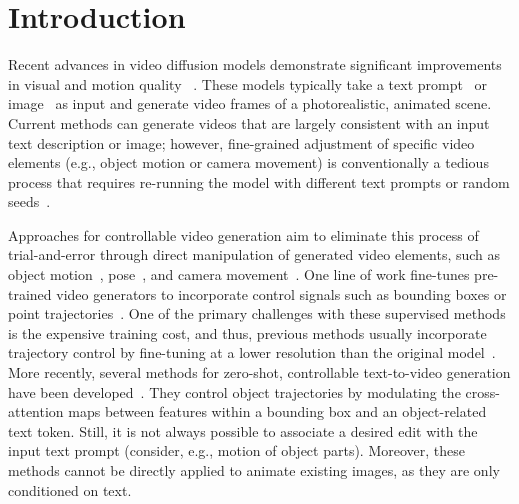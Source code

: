 \section{Introduction}
\label{sec:intro}

Recent advances in video diffusion models demonstrate significant improvements in visual and motion quality ~\citep{VideoDiffusionModels,blattmann2023stable,AlignYourLatents,LVDM}. 
These models typically take a text prompt~\citep{VideoDiffusionModels,blattmann2023stable,ImagenVideo} or image~\citep{VideoCrafter1,VideoCrafter2,AnimateDiff,DynamiCrafter} as input and generate video frames of a photorealistic, animated scene.
Current methods can generate videos that are largely consistent with an input text description or image; however, fine-grained adjustment of specific video elements (e.g., object motion or camera movement) is conventionally a tedious process that requires re-running the model with different text prompts or random seeds~\citep{wu2023freeinit,qiu2024freetraj}.

Approaches for controllable video generation aim to eliminate this process of trial-and-error through direct manipulation of generated video elements, such as object motion~\citep{wu2024draganything,yin2023dragnuwa,wang2024boximator}, pose~\citep{AnimateAnyone,MagicAnimate}, and camera movement~\citep{MotionCtrl,li2024image,CameraCtrl,MotionMaster}.
One line of work fine-tunes pre-trained video generators to incorporate control signals such as bounding boxes or point trajectories~\citep{wu2024draganything,MotionCtrl}. 
One of the primary challenges with these supervised methods is the expensive training cost, and thus, previous methods usually incorporate trajectory control by fine-tuning at a lower resolution than the original model~\cite{wu2024draganything, yin2023dragnuwa}.
More recently, several methods for zero-shot, controllable text-to-video generation have been developed~\citep{ma2023trailblazer,qiu2024freetraj,jain2024peekaboo}.
They control object trajectories by modulating the cross-attention maps between features within a bounding box and an object-related text token.
Still, it is not always possible to associate a desired edit with the input text prompt (consider, e.g., motion of object parts). 
Moreover, these methods cannot be directly applied to animate existing images, as they are only conditioned on text.

